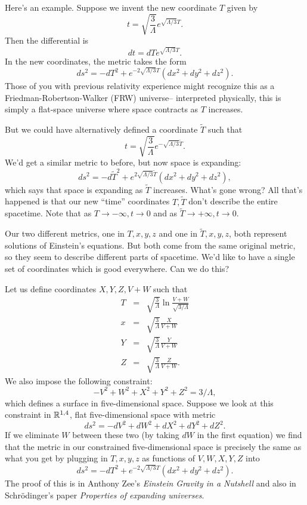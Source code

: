 Here's an example. Suppose we invent the new coordinate $T$ given by
$$t=\sqrt{\frac{3}{\Lambda}} e^{\sqrt{\Lambda/3} T}.$$
Then the differential is
$$dt=dT e^{\sqrt{\Lambda/3}T}.$$
In the new coordinates, the metric takes the form
$$ds^2 = -dT^2 + e^{-2\sqrt{\Lambda/3}T}(dx^2+dy^2+dz^2).$$
Those of you with previous relativity experience might recognize this as a Friedman-Robertson-Walker (FRW) universe-- interpreted physically, this is simply a flat-space universe where space contracts as $T$ increases.

But we could have alternatively defined a coordinate $\tilde T$ such that
$$t=\sqrt{\frac{3}{\Lambda}}e^{-\sqrt{\Lambda/3}\tilde T}.$$
We'd get a similar metric to before, but now space is expanding:
$$ds^2 = -d\tilde T^2 +e^{2\sqrt{\Lambda/3}\tilde T} (dx^2+dy^2 + dz^2),$$
which says that space is expanding as $\tilde T$ increases. What's gone wrong? All that's happened is that our new ``time'' coordinates $T,\tilde T$ don't describe the entire spacetime. Note that as $T\to -\infty, t\to 0$ and as $\tilde T \to +\infty, t\to 0$.

Our two different metrics, one in $T,x,y,z$ and one in $\tilde T,x,y,z$, both represent solutions of Einstein's equations. But both come from the same original metric, so they seem to describe different parts of spacetime. We'd like to have a single set of coordinates which is good everywhere. Can we do this?

Let us define coordinates $X,Y,Z,V+W$ such that
\begin{eqnarray*}
T&=&\sqrt{\frac{3}{\Lambda}}\ln \frac{V+W}{\sqrt{3/\Lambda}}\\
x&=& \sqrt{\frac{3}{\Lambda}} \frac{X}{V+W}\\
Y&=& \sqrt{\frac{3}{\Lambda}} \frac{Y}{V+W}\\
Z&=& \sqrt{\frac{3}{\Lambda}} \frac{Z}{V+W}.
\end{eqnarray*}
We also impose the following constraint:
$$-V^2+W^2+X^2+Y^2 +Z^2=3/\Lambda,$$
which defines a surface in five-dimensional space. Suppose we look at this constraint in $\mathbb{R}^{1,4}$, flat five-dimensional space with metric
$$ds^2=-dV^2+dW^2+dX^2+dY^2+dZ^2.$$
If we eliminate $W$ between these two (by taking $dW$ in the first equation) we find that the metric in our constrained five-dimensional space is precisely the same as what you get by plugging in
$T,x,y,z$ as functions of $V,W,X,Y,Z$ into
$$ds^2=-dT^2+e^{-2\sqrt{\Lambda/3}T}(dx^2+dy^2+dz^2).$$
The proof of this is in Anthony Zee's \textit{Einstein Gravity in a Nutshell} and also in Schr\"odinger's paper \textit{Properties of expanding universes}.